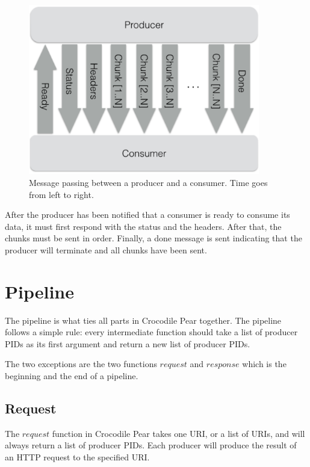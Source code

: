 \documentclass{cslthse-msc}
\begin{document}
\begin{figure}[H]
  \centering
    \begin{center}
      \includegraphics[width=0.9\textwidth]{images/crocpear_producer_consumer.png}
    \end{center}
  \caption{Message passing between a producer and a consumer. Time goes from left to right.}
\end{figure}

After the producer has been notified that a consumer is ready to consume its data, it must first respond with the status and the headers. After that, the chunks must be sent in order. Finally, a done message is sent indicating that the producer will terminate and all chunks have been sent.

\section{Pipeline}
The pipeline is what ties all parts in Crocodile Pear together. The pipeline follows a simple rule: every intermediate function should take a list of producer PIDs as its first argument and return a new list of producer PIDs.

The two exceptions are the two functions $request$ and $response$ which is the beginning and the end of a pipeline.

\subsection{Request}
The $request$ function in Crocodile Pear takes one URI, or a list of URIs, and will always return a list of producer PIDs. Each producer will produce the result of an HTTP request to the specified URI.
\end{document}
